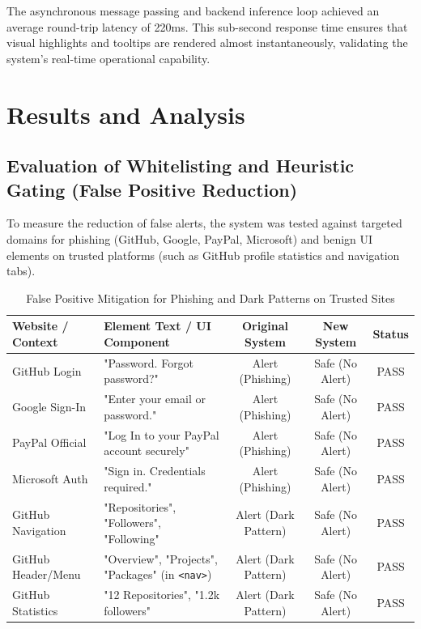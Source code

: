 The asynchronous message passing and backend inference loop achieved an average round-trip latency of 220ms. This sub-second response time ensures that visual highlights and tooltips are rendered almost instantaneously, validating the system's real-time operational capability.

\section{Results and Analysis}

\subsection{Evaluation of Whitelisting and Heuristic Gating (False Positive Reduction)}
To measure the reduction of false alerts, the system was tested against targeted domains for phishing (GitHub, Google, PayPal, Microsoft) and benign UI elements on trusted platforms (such as GitHub profile statistics and navigation tabs).

\begin{table}[H]
\centering
\caption{False Positive Mitigation for Phishing and Dark Patterns on Trusted Sites}
\vspace{0.1cm}
\renewcommand{\arraystretch}{1.2}
\begin{tabular}{|l|p{6cm}|c|c|c|}
\hline
\textbf{Website / Context} & \textbf{Element Text / UI Component} & \textbf{Original System} & \textbf{New System} & \textbf{Status} \\
\hline
GitHub Login & "Password. Forgot password?" & Alert (Phishing) & Safe (No Alert) & PASS \\
\hline
Google Sign-In & "Enter your email or password." & Alert (Phishing) & Safe (No Alert) & PASS \\
\hline
PayPal Official & "Log In to your PayPal account securely" & Alert (Phishing) & Safe (No Alert) & PASS \\
\hline
Microsoft Auth & "Sign in. Credentials required." & Alert (Phishing) & Safe (No Alert) & PASS \\
\hline
GitHub Navigation & "Repositories", "Followers", "Following" & Alert (Dark Pattern) & Safe (No Alert) & PASS \\
\hline
GitHub Header/Menu & "Overview", "Projects", "Packages" (in \texttt{<nav>}) & Alert (Dark Pattern) & Safe (No Alert) & PASS \\
\hline
GitHub Statistics & "12 Repositories", "1.2k followers" & Alert (Dark Pattern) & Safe (No Alert) & PASS \\
\hline
\end{tabular}
\end{table}

